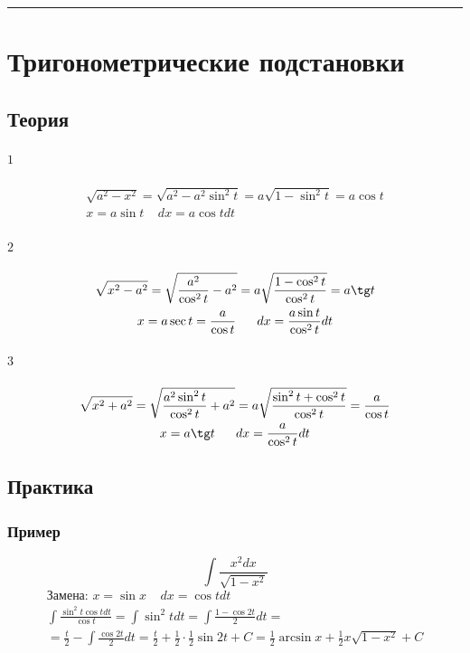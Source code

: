 \documentclass{article}
\begin{document}
\par\noindent\rule{\textwidth}{1pt}
\section{Тригонометрические подстановки}

\subsection{Теория}
\paragraph{$\boxed{1}$}
\begin{gather*}
    \sqrt{a^2 - x^2} = \sqrt{a^2 - a^2 \sin^2 t} = a \sqrt{1 - \sin^2 t} = a \cos t \\
    x = a \sin t ~~~~~ dx = a \cos t dt
\end{gather*}
\paragraph{$\boxed{2}$}
\begin{gather*}
    \sqrt{x^2 - a^2} = \sqrt{\frac{a^2}{\cos^2 t} - a^2} = a \sqrt{\frac{1 - \cos^2 t}{\cos^2 t}} = a \tg t \\
    x = a \sec t = \frac{a}{\cos t} ~~~~~ dx = \frac{a \sin t}{\cos^2 t} dt
\end{gather*}
\paragraph{$\boxed{3}$}
\begin{gather*}
    \sqrt{x^2 + a^2} = \sqrt{\frac{a^2 \sin^2 t}{\cos^2 t} + a^2} =
    a \sqrt{\frac{\sin^2 t + \cos^2 t}{\cos^2 t}} = \frac{a}{\cos t} \\
    x = a \tg t ~~~~~ dx = \frac{a}{\cos^2 t} dt
\end{gather*}


\subsection{Практика}

\subsubsection{Пример}
\[
    \int \frac{x^2 dx}{\sqrt{1 - x^2}}
\]
\begin{gather*}
    \text{Замена: } x = \sin x ~~~~~ dx = \cos t dt \\
      \int \frac{\sin^2 t \cos t dt}{\cos t} =
      \int \sin^2 t dt =
      \int \frac{1 - \cos 2t}{2} dt =                           \\
    = \frac{t}{2} - \int \frac{\cos 2t}{2} dt =
      \frac{t}{2} + \frac{1}{2} \cdot \frac{1}{2} \sin 2t + C =
      \frac{1}{2} \arcsin x + \frac{1}{2} x \sqrt{1 - x^2} + C  \\  
\end{gather*}
\end{document}
